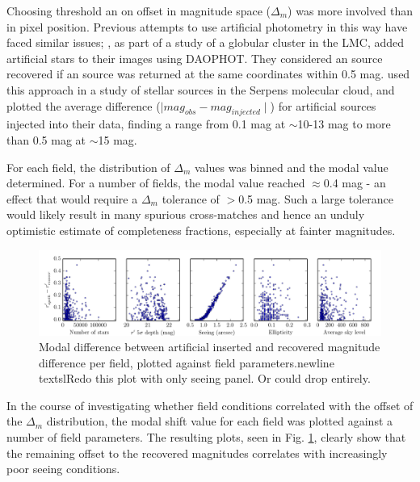 \documentclass[a4paper,useAMS,usenatbib]{mn2e}
\begin{document}
Choosing threshold an on offset in magnitude space ($\Delta_m$) was more involved than in pixel position. Previous attempts to use artificial photometry in this way have faced similar issues; \citet{Mateo1986}, as part of a study of a globular cluster in the LMC, added artificial stars to their
images using \textsc{DAOPHOT}. They considered an source recovered if an
source was returned at the same coordinates within 0.5 mag. \citet{Harvey2006}
used this approach in a study of stellar sources in the Serpens molecular
cloud, and plotted the average difference ($\mid mag_{obs}-mag_{injected}\mid$) for artificial sources injected into their data, finding a range from 0.1 mag at $\sim$10-13 mag to more than 0.5 mag at $\sim$15 mag.

For each field, the distribution of $\Delta_m$ values was binned and the modal
value determined. For a number of fields, the modal value reached $\approx$0.4
mag - an effect that would require a $\Delta_m$ tolerance of $>$0.5 mag. Such
a large tolerance would likely result in many spurious cross-matches and hence
an unduly optimistic estimate of completeness fractions, especially at fainter
magnitudes.

\begin{figure}
\begin{center}
\includegraphics[width=1\linewidth]{figures/magdiff_parameters.pdf} 
\caption{\footnotesize{Modal difference between artificial inserted and
recovered magnitude difference per field, plotted against field
parameters.newline textsl{Redo this plot with only seeing panel. Or could
drop entirely.}}}
\label{fig:magdiff_parameters}
\end{center}
\end{figure}

In the course of investigating whether field conditions correlated with the
offset of the $\Delta_m$ distribution, the modal shift value for each field
was plotted against a number of field parameters. The resulting plots, seen in
Fig. \ref{fig:magdiff_parameters}, clearly show that the remaining offset to
the recovered magnitudes correlates with increasingly poor seeing conditions.
\end{document}
